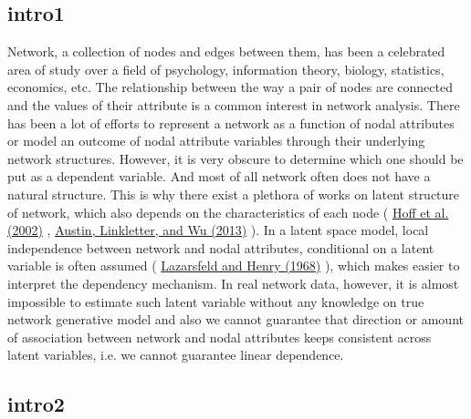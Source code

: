 \documentclass[12pt]{article}
\theoremstyle{definition}
\begin{document}
\subsection{intro1}

Network, a collection of nodes and edges between them, has been a celebrated area of study over a field of psychology, information theory, biology, statistics, economics, etc. The relationship between the way a pair of nodes are connected and the values of their attribute is a common interest in network analysis. There has been a lot of efforts to represent a network as a function of nodal attributes or model an outcome of nodal attribute variables through their underlying network structures. However, it is very obscure to determine which one should be put as a dependent variable. And most of all network often does not have a natural structure. This is why there exist a plethora of works on latent structure of network, which also depends on the characteristics of each node ( \hyperlink{Hoff}{Hoff et al. (2002)}  , \hyperlink{Austin}{Austin, Linkletter, and Wu (2013)} ). In a latent space model, local independence between network and nodal attributes, conditional on a latent variable is often assumed ( \hyperlink{Lazarsfeld}{Lazarsfeld and Henry (1968)} ), which makes easier to interpret the dependency mechanism. In real network data, however, it is almost impossible to estimate such latent variable without any knowledge on true network generative model and also we cannot guarantee that direction or amount of association between network and nodal attributes keeps consistent across latent variables, i.e. we cannot guarantee linear dependence. 


\subsection{intro2}
 
\end{document}
